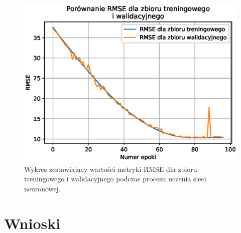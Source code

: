 \documentclass[a4paper,11pt]{article}
\begin{document}
    \bigskip

    \begin{figure}[H]
        \label{fig:f_m_rmse_train_valid}
        \centering
        \includegraphics[width=\textwidth]{f_m_rmse_train_valid}
        \caption{Wykres zestawiający wartości metryki RMSE dla zbioru treningowego i walidacyjnego podczas procesu uczenia sieci neuronowej.}
    \end{figure}


    \section{Wnioski}


    \printbibliography
\end{document}
